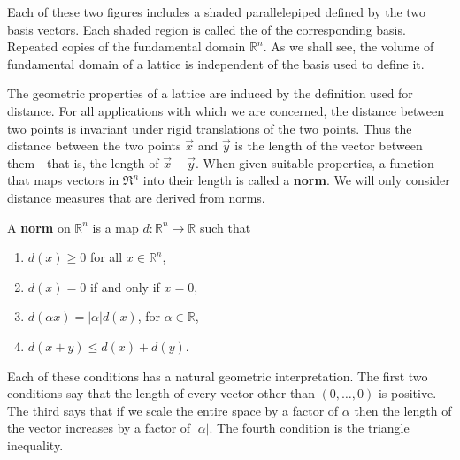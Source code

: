 Each of these two figures includes a shaded parallelepiped defined by
the two basis vectors.  Each shaded region is called the
 of the corresponding basis.  Repeated copies
of the fundamental domain  $\mathbb{R}^{n}$.  As we shall see,
the volume of fundamental domain of a lattice is independent of the
basis used to define it.

The geometric properties of a lattice are induced by the definition
used for distance.  For all applications with which we are concerned,
the distance between two points is invariant under rigid translations
of the two points.  Thus the distance between the two points $\vec{x}$
and $\vec{y}$ is the length of the vector between them---that is, the
length of $\vec{x}-\vec{y}$.  When given suitable properties, a function
that maps vectors in $\Re^n$ into their length is called a \textbf{norm}.
We will only consider distance measures that are derived from norms.

\begin{definition}
A {\bf norm} on $\mathbb{R}^{n}$ is a map 
$d: \mathbb{R}^{n} \rightarrow \mathbb{R}$ such that 
\begin{enumerate}
\item $d(x) \ge 0$ for all $x \in \mathbb{R}^{n}$,
\item $d(x) = 0$ if and only if $x = 0$,
\item $d(\alpha x) = |\alpha| d(x)$, for $\alpha \in \mathbb{R}$,
\item $d(x+y) \le d(x) + d(y)$.
\end{enumerate}
\end{definition}

Each of these conditions has a natural geometric interpretation.  The
first two conditions say that the length of every vector other than
$(0, \ldots, 0)$ is positive.  The third says that if we scale the
entire space by a factor of $\alpha$ then the length of the vector
increases by a factor of $|\alpha|$.  The fourth condition is the
triangle inequality.

